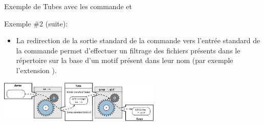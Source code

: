 \begin{frame}{Exemple de Tubes avec les commande  et }
  \begin{alertblock}{Exemple \#2 (suite):}
    \begin{itemize}
    \item La redirection de la sortie standard de la commande 
      vers l'entrée standard de la commande  permet
      d'effectuer un filtrage des fichiers présents dans le répertoire
      sur la base d'un motif présent dans leur nom (par exemple
      l'extension ).
    \end{itemize}
    \begin{center}
      \includegraphics[height=2cm]{img/s05/stdin_stdout_tube_ls_grep.jpg}
    \end{center}
    \begin{columns}
      \begin{column}{6cm}
        \small{  }
      \end{column}
      \begin{column}{6cm}
      \end{column}
    \end{columns}
  \end{alertblock}
\end{frame}




